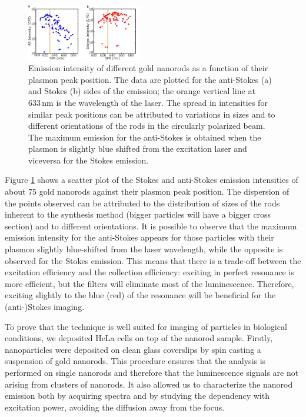 \documentclass[journal=nalefd,manuscript=letter]{achemso}
\newcommand{\nm}{\ensuremath{\,\textrm{nm}}}
\begin{document}
\begin{figure}[htp] \centering
\includegraphics[width=0.45\textwidth]{Figures/02_Intensity_SPR/Intensity_SPR.png}
\caption{Emission intensity of different gold nanorods as a function of their plasmon peak position. The data are plotted for the
anti-Stokes (a) and Stokes (b) sides of the emission; the orange vertical line
at $633\nm$ is the wavelength of the laser. The spread in intensities for
similar peak positions can be attributed to variations in sizes and to different
orientations of the rods in the circularly polarized beam. The
maximum emission for the anti-Stokes is obtained when the plasmon is slightly
blue shifted from the excitation laser and viceversa for the Stokes emission.}
	\label{fig:emission_peak_position}
\end{figure} 

Figure \ref{fig:emission_peak_position} shows a scatter plot of the Stokes and anti-Stokes emission
intensities of about 75 gold nanorods against their plasmon peak position. The dispersion of the points observed can be attributed to the
distribution of sizes of the rods inherent to the synthesis
method\cite{Zijlstra2011} (bigger particles will have a bigger cross section) and to different orientations.
It is possible to observe that the maximum emission intensity for the
anti-Stokes appears for those particles with their plasmon slightly blue-shifted
from the laser wavelength, while the opposite is observed for the Stokes
emission. This means that there is a trade-off between the excitation efficiency
and the collection efficiency: exciting in perfect resonance is more efficient,
but the filters will eliminate most of the luminescence. Therefore, exciting
slightly to the blue (red) of the resonance will be beneficial for the
(anti-)Stokes imaging.

To prove that the technique is well suited for imaging of particles in
biological conditions, we deposited HeLa cells on top of the nanorod sample.
Firstly, nanoparticles were deposited on clean glass coverslips by spin casting
a suspension of gold nanorods. This procedure ensures that the analysis is performed on
single nanorods and therefore that the luminescence signals are not arising from
clusters of nanorods. It also allowed us to characterize the nanorod emission both by
acquiring spectra and by studying the dependency with excitation power, avoiding
the diffusion away from the focus. 
\end{document}
